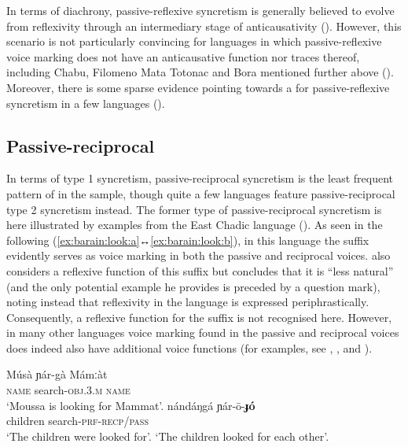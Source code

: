 In terms of diachrony, passive-reflexive syncretism is generally believed to evolve from reflexivity through an intermediary stage of anticausativity (). However, this scenario is not particularly convincing for languages in which passive-reflexive voice marking does not have an anticausative function nor traces thereof, including Chabu, Filomeno Mata Totonac and Bora mentioned further above (). Moreover, there is some sparse evidence pointing towards a  for passive-reflexive syncretism in a few languages ().

\subsection{Passive-reciprocal} \label{sec:simple-syncretism:pass-recp}
In terms of type 1 syncretism, passive-reciprocal syncretism is the least frequent pattern of  in the sample, though quite a few languages feature passive-reciprocal type 2 syncretism instead. The former type of passive-reciprocal syncretism is here illustrated by examples from the East Chadic language  (). As seen in the following  (\ref{ex:barain:look:a}↔\ref{ex:barain:look:b}), in this language the suffix  evidently serves as voice marking in both the passive and reciprocal voices. \citet[148ff.]{lovestrand:2012} also considers a reflexive function of this suffix but concludes that it is “less natural” (and the only potential example he provides is preceded by a question mark), noting instead that reflexivity in the language is expressed periphrastically. Consequently, a reflexive function for the suffix  is not recognised here. However, in many other languages voice marking found in the passive and reciprocal voices does indeed also have additional voice functions (for examples, see , , and ).

\ea {} \citep[137, 150]{lovestrand:2012}
\ea\label{ex:barain:look:a}
	\gll	Músà ɲár-gà Mámːàt \\
			\textsc{name} search-\textsc{obj.3.m} \textsc{name} \\
	\glt	‘Moussa is looking for Mammat’.
\ex\label{ex:barain:look:b}
	\gll	nándáŋgá ɲár-ō-\textbf{ɟó} \\
			children search-\textsc{prf-recp/pass} \\
	\glt	‘The children were looked for’.
	\glt	‘The children looked for each other’.
	\z 
\z

